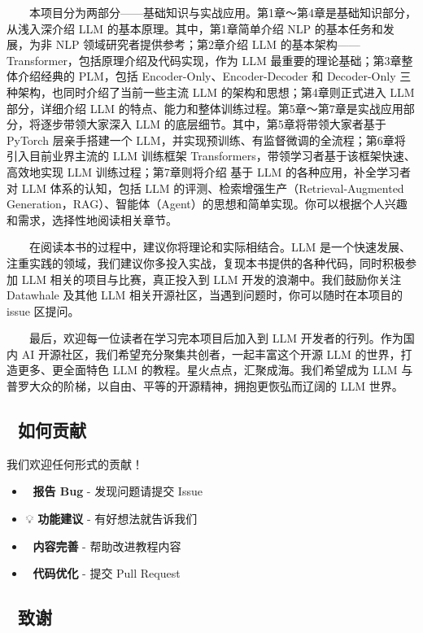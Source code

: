 \documentclass[
]{article}
\providecommand{\tightlist}{%
  \setlength{\itemsep}{0pt}\setlength{\parskip}{0pt}}
\begin{document}
  本项目分为两部分------基础知识与实战应用。第1章～第4章是基础知识部分，从浅入深介绍
LLM 的基本原理。其中，第1章简单介绍 NLP 的基本任务和发展，为非 NLP
领域研究者提供参考；第2章介绍 LLM
的基本架构------Transformer，包括原理介绍及代码实现，作为 LLM
最重要的理论基础；第3章整体介绍经典的 PLM，包括
Encoder-Only、Encoder-Decoder 和 Decoder-Only
三种架构，也同时介绍了当前一些主流 LLM 的架构和思想；第4章则正式进入 LLM
部分，详细介绍 LLM
的特点、能力和整体训练过程。第5章～第7章是实战应用部分，将逐步带领大家深入
LLM 的底层细节。其中，第5章将带领大家者基于 PyTorch 层亲手搭建一个
LLM，并实现预训练、有监督微调的全流程；第6章将引入目前业界主流的 LLM
训练框架 Transformers，带领学习者基于该框架快速、高效地实现 LLM
训练过程；第7章则将介绍 基于 LLM 的各种应用，补全学习者对 LLM
体系的认知，包括 LLM 的评测、检索增强生产（Retrieval-Augmented
Generation，RAG）、智能体（Agent）的思想和简单实现。你可以根据个人兴趣和需求，选择性地阅读相关章节。

  在阅读本书的过程中，建议你将理论和实际相结合。LLM
是一个快速发展、注重实践的领域，我们建议你多投入实战，复现本书提供的各种代码，同时积极参加
LLM 相关的项目与比赛，真正投入到 LLM 开发的浪潮中。我们鼓励你关注
Datawhale 及其他 LLM 相关开源社区，当遇到问题时，你可以随时在本项目的
issue 区提问。

  最后，欢迎每一位读者在学习完本项目后加入到 LLM 开发者的行列。作为国内
AI 开源社区，我们希望充分聚集共创者，一起丰富这个开源 LLM
的世界，打造更多、更全面特色 LLM
的教程。星火点点，汇聚成海。我们希望成为 LLM
与普罗大众的阶梯，以自由、平等的开源精神，拥抱更恢弘而辽阔的 LLM 世界。

\subsection{🤝 如何贡献}\label{ux5982ux4f55ux8d21ux732e}

我们欢迎任何形式的贡献！

\begin{itemize}
\tightlist
\item
  🐛 \textbf{报告 Bug} - 发现问题请提交 Issue
\item
  💡 \textbf{功能建议} - 有好想法就告诉我们
\item
  📝 \textbf{内容完善} - 帮助改进教程内容
\item
  🔧 \textbf{代码优化} - 提交 Pull Request
\end{itemize}

\subsection{🙏 致谢}\label{ux81f4ux8c22}
\end{document}
